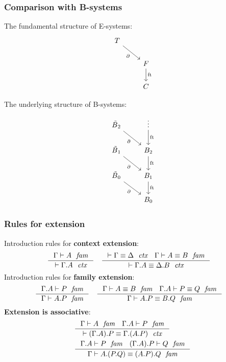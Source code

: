 \documentclass[handout]{beamer}
\newcommand\important[1]{\textbf{\color{red!90!black}#1}}
\newcommand{\Btilde}{\skew{4}{\tilde}{B}}
\begin{document}
\begin{frame}
\frametitle{\bf Comparison with B-systems}
\begin{minipage}[t]{.42\textwidth}
The fundamental structure of E-systems:
\\[1.8cm]
\begin{equation*}
\begin{tikzcd}[ampersand replacement=\&]
\stesyst
  \ar{dr}[swap]{\ebd}
  \\
  {}\&
\stesysf
  \ar{d}{\eft}
  \\
  {}\&
\stesysc
\end{tikzcd}
\end{equation*}
\end{minipage}
\hfill
\begin{minipage}[t]{.42\textwidth}
The underlying structure of B-systems:
\vfill
\begin{equation*}
\begin{tikzcd}[ampersand replacement=\&]
\Btilde_2
  \ar{dr}[swap]{\ebd}
  \&
\vdots
  \ar{d}{\eft}
  \\
\Btilde_1
  \ar{dr}[swap]{\ebd}
  \&
B_2
  \ar{d}{\eft}
  \\
\Btilde_0
  \ar{dr}[swap]{\ebd}
  \&
B_1
  \ar{d}{\eft}
  \\
  {}\&
B_0
\end{tikzcd}
\end{equation*}
\end{minipage}
\end{frame}

\begin{frame}
\frametitle{\bf Rules for extension}
Introduction rules for \important{context extension}:
\begin{align*}
& \inference
  { \jfam{\Gamma}{A}
    }
  { \jctx{\ctxext{\Gamma}{A}}
    }
& & \inference
    { \jctxeq{\Gamma}{\Delta}
      \jfameq{\Gamma}{A}{B}
      }
    { \jctxeq{\ctxext{\Gamma}{A}}{\ctxext{\Delta}{B}}
      }
\end{align*}
\pause
Introduction rules for \important{family extension}:
\begin{align*}
& \inference
  { \jfam{{\Gamma}{A}}{P}
    }
  { \jfam{\Gamma}{\ctxext{A}{P}}
    }
& & \inference
    { \jfameq{\Gamma}{A}{B} 
      \jfameq{{\Gamma}{A}}{P}{Q}
      }
    { \jfameq{\Gamma}{\ctxext{A}{P}}{\ctxext{B}{Q}}
      }
\end{align*}
\pause
\important{Extension is associative}:
\begin{align*}
& \inference
  { \jfam{\Gamma}{A}
    \jfam{{\Gamma}{A}}{P}
    }
  { \jctxeq{\ctxext{{\Gamma}{A}}{P}}{\ctxext{\Gamma}{{A}{P}}}
    }
  \\
& \inference
  { \jfam{{\Gamma}{A}}{P}
    \jfam{{{\Gamma}{A}}{P}}{Q}
    }
  { \jfameq{\Gamma}{\ctxext{A}{{P}{Q}}}{\ctxext{{A}{P}}{Q}}
    }
\end{align*}
\end{frame}
\end{document}
